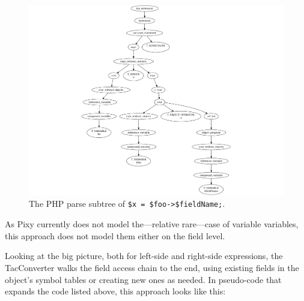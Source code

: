 \begin{figure}[htb]
  \begin{center}
    \includegraphics[scale=0.7]{images/variable-field-access-right}
   \caption{The PHP parse subtree of \texttt{\$x = \$foo->\$fieldName;}.}
   \label{fig:variable-field-access-right}
  \end{center}
\end{figure}

As Pixy currently does not model the---relative rare---case of variable variables, this approach does not model them either on the field level.

Looking at the big picture, both for left-side and right-side expressions, the TacConverter walks the field access chain to the end, using existing fields in the object's symbol tables or creating new ones as needed. In pseudo-code that expands the code listed above, this approach looks like this:


